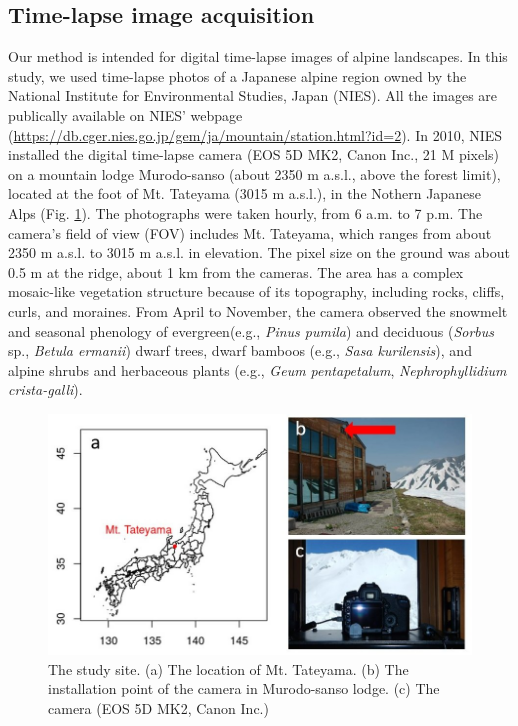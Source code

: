 \documentclass{article}
\begin{document}
\hypertarget{time-lapse-image-acquisition}{%
\subsection{Time-lapse image acquisition}\label{time-lapse-image-acquisition}}

Our method is intended for digital time-lapse images of alpine landscapes. In this study, we used time-lapse photos of a Japanese alpine region owned by the National Institute for Environmental Studies, Japan (NIES). All the images are publically available on NIES' webpage (\url{https://db.cger.nies.go.jp/gem/ja/mountain/station.html?id=2}). In 2010, NIES installed the digital time-lapse camera (EOS 5D MK2, Canon Inc., 21 M pixels) on a mountain lodge Murodo-sanso (about 2350 m a.s.l., above the forest limit), located at the foot of Mt. Tateyama (3015 m a.s.l.), in the Nothern Japanese Alps (Fig. \ref{fig:map}). The photographs were taken hourly, from 6 a.m. to 7 p.m. The camera's field of view (FOV) includes Mt. Tateyama, which ranges from about 2350 m a.s.l. to 3015 m a.s.l. in elevation. The pixel size on the ground was about 0.5 m at the ridge, about 1 km from the cameras. The area has a complex mosaic-like vegetation structure because of its topography, including rocks, cliffs, curls, and moraines. From April to November, the camera observed the snowmelt and seasonal phenology of evergreen(e.g., \emph{Pinus pumila}) and deciduous (\emph{Sorbus} sp., \emph{Betula ermanii}) dwarf trees, dwarf bamboos (e.g., \emph{Sasa kurilensis}), and alpine shrubs and herbaceous plants (e.g., \emph{Geum pentapetalum}, \emph{Nephrophyllidium crista-galli}).



\begin{figure}
\includegraphics[width=1\linewidth]{paper_files/figures/Slide3} \caption{The study site. (a) The location of Mt. Tateyama. (b) The installation point of the camera in Murodo-sanso lodge. (c) The camera (EOS 5D MK2, Canon Inc.)}\label{fig:map}
\end{figure}
\end{document}
